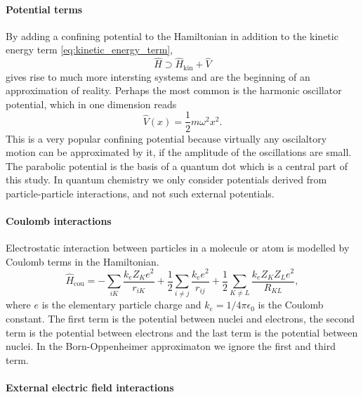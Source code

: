     \paragraph{Potential terms}

    By adding a confining potential to the Hamiltonian in addition to the kinetic 
    energy term \autoref{eq:kinetic_energy_term},
    \begin{equation}
        \hat{H} \supset \hat{H}_\text{kin} + \hat{V}
    \end{equation}
    gives rise to much more intersting systems and are the beginning of an approximation 
    of reality. Perhaps the most common is the harmonic oscillator potential, which 
    in one dimension reads 
    \begin{equation}
        \hat{V}(x) = \frac{1}{2}m\omega^2x^2.
    \end{equation}
    This is a very popular confining potential because virtually any oscilaltory motion can 
    be approximated by it, if the amplitude of the oscillations are small. The parabolic 
    potential is the basis of a quantum dot which is a central part of this study. 
    In quantum chemistry we only consider potentials derived from particle-particle 
    interactions, and not such external potentials.

    \paragraph{Coulomb interactions}

    Electrostatic interaction between particles in a molecule or atom is 
    modelled by Coulomb terms in the Hamiltonian. 
    \begin{equation}
            \hat{H}_{\text{cou}} 
                = -\sum_{iK}\frac{k_eZ_Ke^2}{r_{iK}} 
                    + \frac{1}{2}\sum_{i \neq j} \frac{k_e e^2}{r_{ij}} 
                    + \frac{1}{2}\sum_{K \neq L} \frac{k_eZ_K Z_Le^2}{R_{KL}},
    \end{equation}
    where $e$ is the elementary particle charge and $k_e = 1 / 4\pi\epsilon_0$ is the 
    Coulomb constant.
    The first term is the potential between nuclei and electrons, the second term is
    the potential between electrons and the last term is the potential between 
    nuclei. In the Born-Oppenheimer approximaton we ignore the first and third term.

    \paragraph{External electric field interactions}
    
